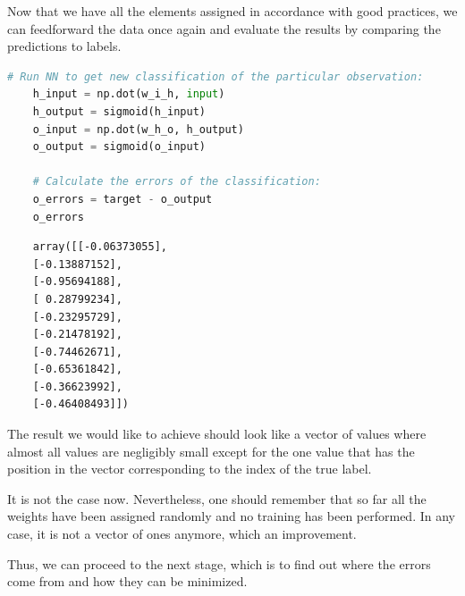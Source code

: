 Now that we have all the elements assigned in accordance with good practices, we can feedforward the data once again and evaluate the results by comparing the predictions to labels.

\begin{lstlisting}[language=Python]
    # Run NN to get new classification of the particular observation:
    h_input = np.dot(w_i_h, input)
    h_output = sigmoid(h_input)
    o_input = np.dot(w_h_o, h_output)
    o_output = sigmoid(o_input)

    # Calculate the errors of the classification:
    o_errors = target - o_output
    o_errors
\end{lstlisting}

\begin{lstlisting}
    array([[-0.06373055],
    [-0.13887152],
    [-0.95694188],
    [ 0.28799234],
    [-0.23295729],
    [-0.21478192],
    [-0.74462671],
    [-0.65361842],
    [-0.36623992],
    [-0.46408493]])
\end{lstlisting}

The result we would like to achieve should look like a vector of values where almost all values are negligibly small except for the one value that has the position in the vector corresponding to the index of the true label. 

It is not the case now. Nevertheless, one should remember that so far all the weights have been assigned randomly and no training has been performed. In any case, it is not a vector of ones anymore, which an improvement.

Thus, we can proceed to the next stage, which is to find out where the errors come from and how they can be minimized.
